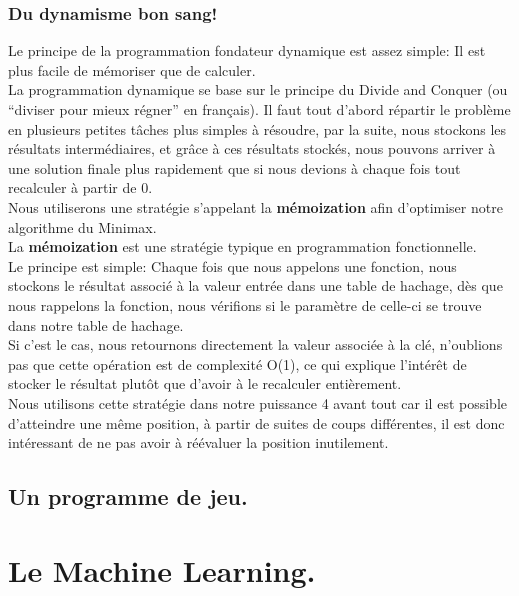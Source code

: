 \documentclass[a4paper, 12pt]{article}
\numberwithin{equation}{subsection}
\begin{document}
\subsubsection{Du dynamisme bon sang!}
Le principe de la programmation fondateur dynamique est assez simple: Il est plus facile de mémoriser que de calculer.\\
La programmation dynamique se base sur le principe du Divide and Conquer (ou ``diviser pour mieux régner'' en français). Il faut tout d'abord répartir le problème en plusieurs petites tâches plus simples à résoudre, par la suite, nous stockons les résultats intermédiaires, et grâce à ces résultats stockés, nous pouvons arriver à une solution finale plus rapidement que si nous devions à chaque fois tout recalculer à partir de 0.\\
Nous utiliserons une stratégie s'appelant la {\bf mémoization} afin d'optimiser notre algorithme du Minimax.\\
La {\bf mémoization} est une stratégie typique en programmation fonctionnelle.\\
Le principe est simple: Chaque fois que nous appelons une fonction, nous stockons le résultat associé à la valeur entrée dans une table de hachage, dès que nous rappelons la fonction, nous vérifions si le paramètre de celle-ci se trouve dans notre table de hachage.\\
Si c'est le cas, nous retournons directement la valeur associée à la clé, n'oublions pas que cette opération est de complexité O(1), ce qui explique l'intérêt de stocker le résultat plutôt que d'avoir à le recalculer entièrement.\\
Nous utilisons cette stratégie dans notre puissance 4 avant tout car il est possible d'atteindre une même position, à partir de suites de coups différentes, il est donc intéressant de ne pas avoir à réévaluer la position inutilement.\\
\subsection{Un programme de jeu.}

\newpage
\section{Le Machine Learning.}
\end{document}
